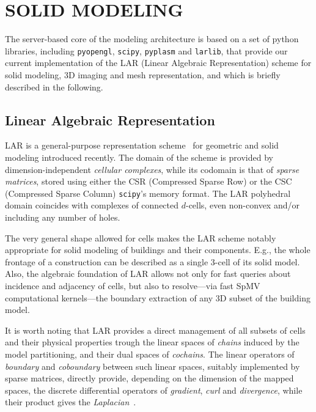 \section{\uppercase{Solid Modeling}}
\label{sec:modeling}



The server-based core of the modeling architecture is based on a set of python libraries, including \texttt{pyopengl}, \texttt{scipy}, \texttt{pyplasm} and \texttt{larlib}, that provide our current implementation of the LAR (Linear Algebraic Representation) scheme for solid modeling, 3D imaging and mesh representation, and which is briefly described in the following.

\subsection{Linear Algebraic Representation}

LAR is a general-purpose representation scheme~\cite{Dicarlo:2014:TNL:2543138.2543294} for geometric and solid modeling introduced recently. The domain of the scheme is provided by dimension-independent \emph{cellular complexes}, while its codomain is that of \emph{sparse matrices}, stored using either the CSR (Compressed Sparse Row) or the CSC (Compressed Sparse Column) \texttt{scipy}'s memory format. The LAR polyhedral domain coincides with complexes of connected $d$-cells, even non-convex and/or including any number of holes. 

The very general shape allowed for cells makes the LAR scheme notably appropriate for solid modeling of buildings and their components. E.g., the whole frontage of a construction can be described as a single 3-cell of its solid model. Also, the algebraic foundation of LAR allows not only for fast queries about incidence and adjacency of cells, but also to resolve---via fast SpMV computational kernels---the boundary extraction of any 3D subset of the building model. 

It is worth noting that LAR provides a direct management of all subsets of cells and their physical properties trough the linear spaces of \emph{chains} induced by the model partitioning, and their dual spaces of \emph{cochains}. The linear operators of \emph{boundary} and \emph{coboundary} between such linear spaces, suitably implemented by sparse matrices, directly provide, depending on the dimension of the mapped spaces, the discrete differential operators of \emph{gradient}, \emph{curl} and \emph{divergence}, while their product gives the \emph{Laplacian}~\cite{ieee-tase}.  

